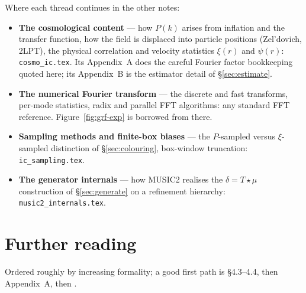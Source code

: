 \documentclass[12pt]{article}
\newcommand{\code}[1]{\texttt{#1}}
\begin{document}
\medskip\noindent Where each thread continues in the other notes:
\begin{itemize}
  \item \textbf{The cosmological content} --- how $P(k)$ arises from
        inflation and the transfer function, how the field is displaced
        into particle positions (Zel'dovich, 2LPT), the physical
        correlation and velocity statistics $\xi(r)$ and $\psi(r)$:
        \code{cosmo\_ic.tex}.  Its Appendix~A does the careful Fourier
        factor bookkeeping quoted here; its Appendix~B is the estimator
        detail of \S\ref{sec:estimate}.
  \item \textbf{The numerical Fourier transform} --- the discrete and
        fast transforms, per-mode statistics, radix and parallel FFT
        algorithms: any standard FFT reference.  Figure~\ref{fig:grf-exp} is borrowed
        from there.
  \item \textbf{Sampling methods and finite-box biases} --- the
        $P$-sampled versus $\xi$-sampled distinction of
        \S\ref{sec:colouring}, box-window truncation: \code{ic\_sampling.tex}.
  \item \textbf{The generator internals} --- how MUSIC2 realises the
        $\delta = T\star\mu$ construction of \S\ref{sec:generate} on a
        refinement hierarchy: \code{music2\_internals.tex}.
\end{itemize}

\section*{Further reading}

Ordered roughly by increasing formality; a good first path is
\citet{MoBoschWhite2010} \S4.3--4.4, then \citet{BBKS1986} Appendix~A,
then \citet{Pen1997}.
\end{document}
